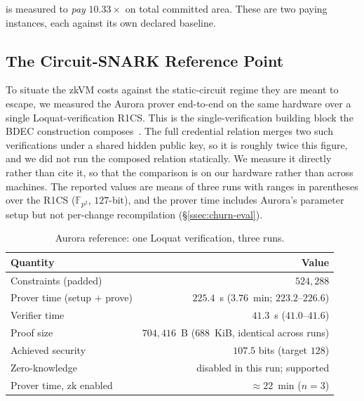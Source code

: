 is measured to \emph{pay} $10.33\times$ on total committed area. These are two paying instances, each against its own declared baseline.

\subsection{The Circuit-SNARK Reference Point}\label{ssec:aurora-ref}
To situate the zkVM costs against the static-circuit regime they are meant to escape, we measured the Aurora prover end-to-end on the same hardware over a single Loquat-verification R1CS. This is the single-verification building block the BDEC construction composes~\cite{10.1007/978-981-96-0957-4_3}. The full credential relation merges two such verifications under a shared hidden public key, so it is roughly twice this figure, and we did not run the composed relation statically. We measure it directly rather than cite it, so that the comparison is on our hardware rather than across machines. The reported values are means of three runs with ranges in parentheses over the R1CS ($\mathbb{F}_{p^2}$, $127$-bit), and the prover time includes Aurora's parameter setup but not per-change recompilation (\S\ref{ssec:churn-eval}).

\begin{table}[H]
\centering
\small
\begin{tabular}{lr}
\toprule
Quantity & Value \\
\midrule
Constraints (padded)        & $524{,}288$ \\
Prover time (setup $+$ prove) & $225.4$~s ($3.76$~min; $223.2$--$226.6$) \\
Verifier time               & $41.3$~s ($41.0$--$41.6$) \\
Proof size                  & $704{,}416$~B ($688$~KiB, identical across runs) \\
Achieved security           & $107.5$ bits (target $128$) \\
Zero-knowledge              & disabled in this run; supported \\
Prover time, zk enabled     & ${\approx}22$~min ($n{=}3$) \\
\bottomrule
\end{tabular}
\caption{Aurora reference: one Loquat verification, three runs.}
\label{tab:aurora-ref}
\end{table}

